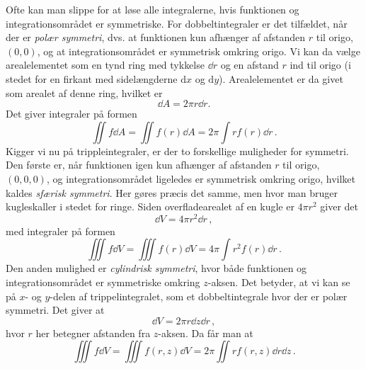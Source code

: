 Ofte kan man slippe for at løse alle integralerne, hvis funktionen og integrationsområdet er symmetriske.
For dobbeltintegraler er det tilfældet, når der er \emph{polær symmetri},
dvs. at funktionen kun afhænger af afstanden $r$ til origo, $(0,0)$, og at integrationsområdet er symmetrisk omkring origo. Vi kan da vælge arealelementet som en tynd ring med tykkelse $\dd r$ og en afstand $r$ ind til origo (i stedet for en firkant med sidelængderne $\text{d}x$ og $\text{d}y$). Arealelementet er da givet som arealet af denne ring, hvilket er
\begin{equation} \label{eq:ArealElementMat}
    \dd{A} = 2\pi r\dd{r}.
\end{equation}
Det giver integraler på formen
\begin{equation} \label{mat:eq:polardoubleint}
    \iint f\dd{A}=\iint f(r) \dd{A}=2\pi\int rf(r)\dd{r} \, .
\end{equation}
Kigger vi nu på trippleintegraler, er der to forskellige muligheder for symmetri.
Den første er, når funktionen igen kun afhænger af afstanden $r$ til origo, $(0,0,0)$, og integrationsområdet ligeledes er symmetrisk omkring origo, hvilket kaldes {\em sfærisk symmetri}.
Her gøres præcis det samme, men hvor man bruger kugleskaller i stedet for ringe. Siden overfladearealet af en kugle er $4\pi r^2$ giver det
\begin{equation}
    \dd{V} = 4\pi r^2 \dd{r} \, ,
\end{equation}
med integraler på formen
\begin{equation}
    \iiint f\dd{V} = \iiint f(r)\dd{V} = 4\pi\int r^2f(r)\dd{r} \, .
\end{equation}
Den anden mulighed er {\em cylindrisk symmetri}, hvor både funktionen og integrationsområdet er symmetriske omkring $z$-aksen. Det betyder, at vi kan se på $x$- og $y$-delen af trippelintegralet, som et dobbeltintegrale hvor der er polær symmetri.
Det giver at
\begin{equation}
    \dd{V} = 2\pi r \dd{z}\dd{r} \, ,
\end{equation}
hvor $r$ her betegner afstanden fra $z$-aksen. Da får man at
\begin{equation}
    \iiint f\dd{V} = \iiint f(r,z)\dd{V} = 2\pi\iint r f(r,z)\dd{r}\dd{z} \, .
\end{equation}



